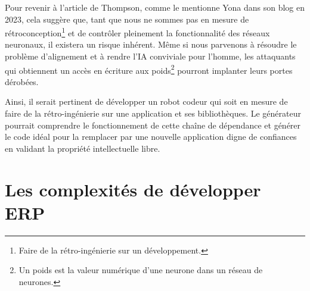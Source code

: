 Pour revenir à l'article de Thompson, comme le mentionne Yona dans son blog en 2023, cela suggère que, tant que nous ne sommes pas en mesure de rétroconception\footnote{Faire de la rétro-ingénierie sur un développement.} et de contrôler pleinement la fonctionnalité des réseaux neuronaux, il existera un risque inhérent. Même si nous parvenons à résoudre le problème d'alignement et à rendre l'IA conviviale pour l'homme, les attaquants qui obtiennent un accès en écriture aux poids\footnote{Un poids est la valeur numérique d'une neurone dans un réseau de neurones.} pourront implanter leurs portes dérobées.~\cite{discussion_reflection_trusting_ia_2023}

Ainsi, il serait pertinent de développer un robot codeur qui soit en mesure de faire de la rétro-ingénierie sur une application et ses bibliothèques. Le générateur pourrait comprendre le fonctionnement de cette chaîne de dépendance et générer le code idéal pour la remplacer par une nouvelle application digne de confiances en validant la propriété intellectuelle libre.

\section{Les complexités de développer ERP}

